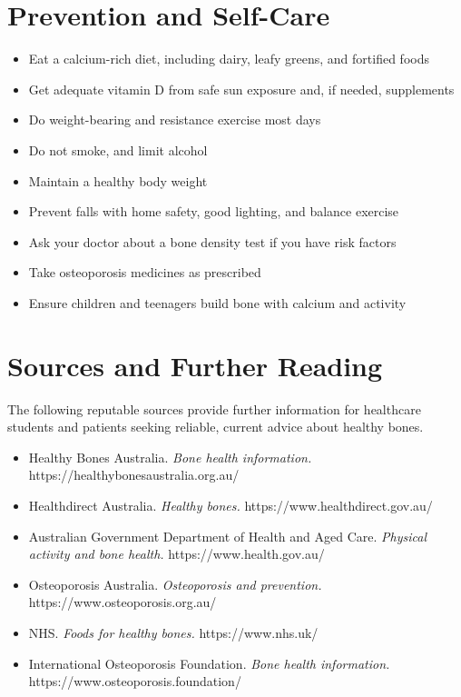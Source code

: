 \section*{Prevention and Self-Care}
\begin{itemize}
    \item Eat a calcium-rich diet, including dairy, leafy greens, and fortified foods
    \item Get adequate vitamin D from safe sun exposure and, if needed, supplements
    \item Do weight-bearing and resistance exercise most days
    \item Do not smoke, and limit alcohol
    \item Maintain a healthy body weight
    \item Prevent falls with home safety, good lighting, and balance exercise
    \item Ask your doctor about a bone density test if you have risk factors
    \item Take osteoporosis medicines as prescribed
    \item Ensure children and teenagers build bone with calcium and activity
\end{itemize}

\section*{Sources and Further Reading}
The following reputable sources provide further information for healthcare students and patients seeking reliable, current advice about healthy bones.

\begin{itemize}
    \item Healthy Bones Australia. \textit{Bone health information.} https://healthybonesaustralia.org.au/
    \item Healthdirect Australia. \textit{Healthy bones.} https://www.healthdirect.gov.au/
    \item Australian Government Department of Health and Aged Care. \textit{Physical activity and bone health.} https://www.health.gov.au/
    \item Osteoporosis Australia. \textit{Osteoporosis and prevention.} https://www.osteoporosis.org.au/
    \item NHS. \textit{Foods for healthy bones.} https://www.nhs.uk/
    \item International Osteoporosis Foundation. \textit{Bone health information.} https://www.osteoporosis.foundation/
\end{itemize}
